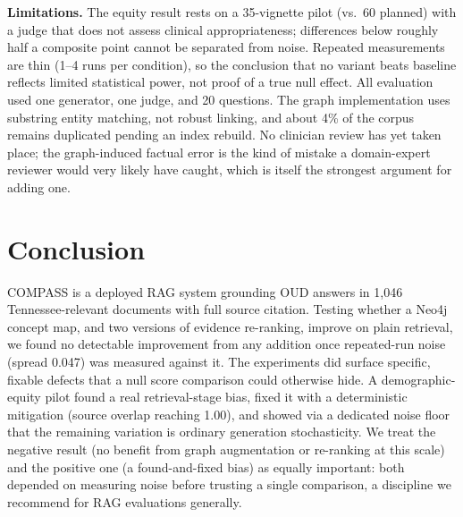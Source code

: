 \documentclass[letterpaper]{article}
\begin{document}
\textbf{Limitations.} The equity result rests on a 35-vignette pilot (vs.\ 60 planned) with a judge that does not assess clinical appropriateness; differences below roughly half a composite point cannot be separated from noise. Repeated measurements are thin (1--4 runs per condition), so the conclusion that no variant beats baseline reflects limited statistical power, not proof of a true null effect. All evaluation used one generator, one judge, and 20 questions. The graph implementation uses substring entity matching, not robust linking, and about 4\% of the corpus remains duplicated pending an index rebuild. No clinician review has yet taken place; the graph-induced factual error is the kind of mistake a domain-expert reviewer would very likely have caught, which is itself the strongest argument for adding one.

\section{Conclusion}

COMPASS is a deployed RAG system grounding OUD answers in 1{,}046 Tennessee-relevant documents with full source citation. Testing whether a Neo4j concept map, and two versions of evidence re-ranking, improve on plain retrieval, we found no detectable improvement from any addition once repeated-run noise (spread 0.047) was measured against it. The experiments did surface specific, fixable defects that a null score comparison could otherwise hide. A demographic-equity pilot found a real retrieval-stage bias, fixed it with a deterministic mitigation (source overlap reaching 1.00), and showed via a dedicated noise floor that the remaining variation is ordinary generation stochasticity. We treat the negative result (no benefit from graph augmentation or re-ranking at this scale) and the positive one (a found-and-fixed bias) as equally important: both depended on measuring noise before trusting a single comparison, a discipline we recommend for RAG evaluations generally.
\end{document}
